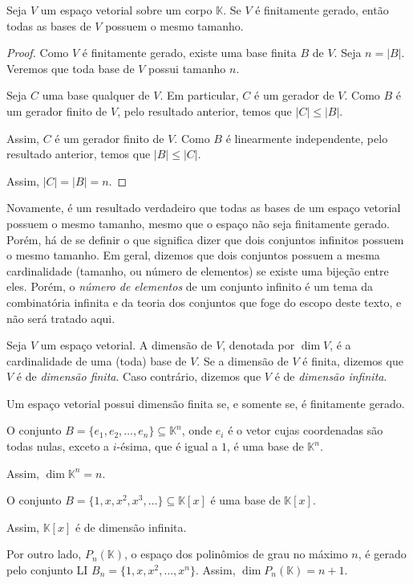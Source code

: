 \begin{corollary}
    Seja $V$ um espaço vetorial sobre um corpo $\mathbb K$.
    Se $V$ é finitamente gerado, então todas as bases de $V$ possuem o mesmo tamanho.
\end{corollary}
\begin{proof}
    Como $V$ é finitamente gerado, existe uma base finita $B$ de $V$.
    Seja $n=|B|$.
    Veremos que toda base de $V$ possui tamanho $n$.

    Seja $C$ uma base qualquer de $V$.
    Em particular, $C$ é um gerador de $V$. Como $B$ é um gerador finito de $V$, pelo resultado anterior, temos que $|C| \leq |B|$.

    Assim, $C$ é um gerador finito de $V$.
    Como $B$ é linearmente independente, pelo resultado anterior, temos que $|B| \leq |C|$.

    Assim, $|C|=|B|=n$.
\end{proof}

Novamente, é um resultado verdadeiro que todas as bases de um espaço vetorial possuem o mesmo tamanho, mesmo que o espaço não seja finitamente gerado.
Porém, há de se definir o que significa dizer que dois conjuntos infinitos possuem o mesmo tamanho.
Em geral, dizemos que dois conjuntos possuem a mesma cardinalidade (tamanho, ou número de elementos) se existe uma bijeção entre eles.
Porém, o \emph{número de elementos} de um conjunto infinito é um tema da combinatória infinita e da teoria dos conjuntos que foge do escopo deste texto, e não será tratado aqui.

\begin{definition}
    Seja $V$ um espaço vetorial.
    A dimensão de $V$, denotada por $\dim V$, é a cardinalidade de uma (toda) base de $V$.
    Se a dimensão de $V$ é finita, dizemos que $V$ é de \emph{dimensão finita}.
    Caso contrário, dizemos que $V$ é de \emph{dimensão infinita}.
\end{definition}

\begin{corollary}
    Um espaço vetorial possui dimensão finita se, e somente se, é finitamente gerado.
\end{corollary}
\begin{example}
    O conjunto $B=\{e_1, e_2, \ldots, e_n\} \subseteq \mathbb K^n$, onde $e_i$ é o vetor cujas coordenadas são todas nulas, exceto a $i$-ésima, que é igual a $1$, é uma base de $\mathbb K^n$.

    Assim, $\dim \mathbb K^n = n$.
\end{example}

\begin{example}
    O conjunto $B=\{1, x, x^2, x^3, \ldots\} \subseteq \mathbb K[x]$ é uma base de $\mathbb K[x]$.

    Assim, $\mathbb K[x]$ é de dimensão infinita.

    Por outro lado, $P_n(\mathbb K)$, o espaço dos polinômios de grau no máximo $n$, é gerado pelo conjunto LI $B_n=\{1, x, x^2, \ldots, x^n\}$.
    Assim, $\dim P_n(\mathbb K) = n+1$.
\end{example}